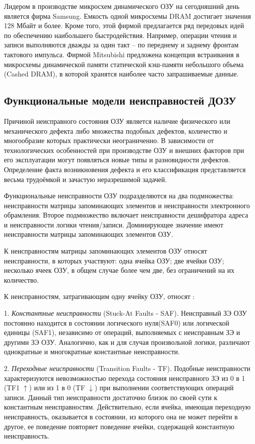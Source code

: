 Лидером в производстве микросхем динамического ОЗУ на сегодняшний день является фирма Samsung. Емкость одной микросхемы DRAM достигает значения 128 Мбайт и более. Кроме того, этой фирмой предлагается ряд передовых идей по обеспечению наибольшего быстродействия. Например, операции чтения и записи выполняются дважды за один такт – по переднему и заднему фронтам тактового импульса. Фирмой Mitsubishi предложена концепция встраивания в микросхемы динамической памяти статической кэш-памяти небольшого объема (Cashed DRAM), в которой хранятся наиболее часто запрашиваемые данные.

\subsection{Функциональные модели неисправностей ДОЗУ}
\label{page:domain:faults}

Причиной неисправного состояния ОЗУ является наличие физического или механического дефекта либо множества подобных дефектов, количество и многообразие которых практически неограниченно. В зависимости от технологических особенностей при производстве ОЗУ и внешних факторов при его эксплуатации могут появляться новые типы и разновидности дефектов. Определение факта возникновения дефекта и его классификация представляется весьма трудоёмкой и зачастую неразрешимой задачей. 

Функциональные неисправности ОЗУ подразделяются на два подмножества: неисправности матрицы запоминающих элементов и неисправности электронного обрамления. Второе подмножество включает неисправности дешифратора адреса и неисправности логики чтения/записи. Доминирующее значение имеют неисправности матрицы запоминающих элементов ОЗУ.

К неисправностям матрицы запоминающих элементов ОЗУ относят неисправности, в которых участвуют: одна ячейка ОЗУ; две ячейки ОЗУ; несколько ячеек ОЗУ, в общем случае более чем две, без ограничений на их количество. 

К неисправностям, затрагивающим одну ячейку ОЗУ, относят \cite{faults}:

1. \textit{Константные неисправности} (Stuck-At Faults - SAF). Неисправный ЗЭ ОЗУ постоянно находится в состоянии логического нуля(SAF0) или логической единицы (SAF1), независимо от операций, выполняемых с неисправным ЗЭ и другими ЗЭ ОЗУ. Аналогично, как и для случая произвольной логики, различают однократные и многократные константные неисправности.

2. \textit{Переходные неисправности} (Transition Faults - TF). Подобные неисправности характеризуются невозможностью перехода состояния неисправного ЗЭ из 0 в 1 (TF1 $\uparrow$) или из 1 в 0 (TF $\downarrow$) при выполнении соответствующих операций записи. Данный тип неисправности достаточно близок по своей сути к константным неисправностям. Действительно, если ячейка, имеющая переходную неисправность, оказывается в состоянии, из которого она не может перейти в другое, ее поведение повторяет поведение ячейки, содержащей константную неисправность.

